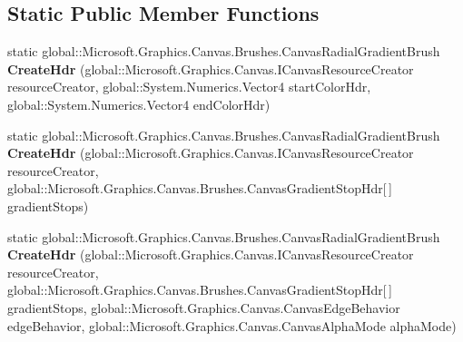 \subsection*{Static Public Member Functions}
\begin{DoxyCompactItemize}
\item 
\mbox{\label{class_microsoft_1_1_graphics_1_1_canvas_1_1_brushes_1_1_canvas_radial_gradient_brush_a9fc3b8b39e6337c070642178c6fb106c}} 
static global\+::\+Microsoft.\+Graphics.\+Canvas.\+Brushes.\+Canvas\+Radial\+Gradient\+Brush {\bfseries Create\+Hdr} (global\+::\+Microsoft.\+Graphics.\+Canvas.\+I\+Canvas\+Resource\+Creator resource\+Creator, global\+::\+System.\+Numerics.\+Vector4 start\+Color\+Hdr, global\+::\+System.\+Numerics.\+Vector4 end\+Color\+Hdr)
\item 
\mbox{\label{class_microsoft_1_1_graphics_1_1_canvas_1_1_brushes_1_1_canvas_radial_gradient_brush_aef0da396142c3d6724253585940535e0}} 
static global\+::\+Microsoft.\+Graphics.\+Canvas.\+Brushes.\+Canvas\+Radial\+Gradient\+Brush {\bfseries Create\+Hdr} (global\+::\+Microsoft.\+Graphics.\+Canvas.\+I\+Canvas\+Resource\+Creator resource\+Creator, global\+::\+Microsoft.\+Graphics.\+Canvas.\+Brushes.\+Canvas\+Gradient\+Stop\+Hdr\mbox{[}$\,$\mbox{]} gradient\+Stops)
\item 
\mbox{\label{class_microsoft_1_1_graphics_1_1_canvas_1_1_brushes_1_1_canvas_radial_gradient_brush_a56c87e8ee5b2516dfc061d3207cbba62}} 
static global\+::\+Microsoft.\+Graphics.\+Canvas.\+Brushes.\+Canvas\+Radial\+Gradient\+Brush {\bfseries Create\+Hdr} (global\+::\+Microsoft.\+Graphics.\+Canvas.\+I\+Canvas\+Resource\+Creator resource\+Creator, global\+::\+Microsoft.\+Graphics.\+Canvas.\+Brushes.\+Canvas\+Gradient\+Stop\+Hdr\mbox{[}$\,$\mbox{]} gradient\+Stops, global\+::\+Microsoft.\+Graphics.\+Canvas.\+Canvas\+Edge\+Behavior edge\+Behavior, global\+::\+Microsoft.\+Graphics.\+Canvas.\+Canvas\+Alpha\+Mode alpha\+Mode)
\item 
\mbox{\label{class_microsoft_1_1_graphics_1_1_canvas_1_1_brushes_1_1_canvas_radial_gradient_brush_a51c1cc7d4745f7d2f3e322b078cc04cb}} 

\end{DoxyCompactItemize}
